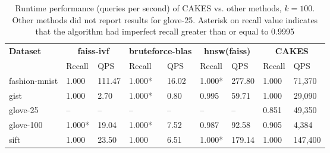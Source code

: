 \begin{table*}[!t]
    \caption{Runtime performance (queries per second) of CAKES vs. other methods, $k=100$. Other methods did not report results for glove-25. Asterisk on recall value indicates that the algorithm had imperfect recall greater than or equal to 0.9995}
    \label{table:results:ann-100}
    \vskip 0.15in
    \begin{center}
    \begin{small}
    \begin{sc}
    \begin{tabular}{|l|p{1cm}|p{1cm}|p{1cm}|p{1cm}|p{1cm}|p{1cm}|p{1cm}|p{1cm}|}
    \textbf{Dataset}  & \multicolumn{2}{|c|}{\textbf{faiss-ivf}} & \multicolumn{2}{|c|}{\textbf{bruteforce-blas}} & \multicolumn{2}{|c|}{\textbf{hnsw(faiss)}} & \multicolumn{2}{|c|}{\textbf{CAKES}} \\
    &                    Recall & QPS  & Recall & QPS     & Recall & QPS      & Recall & QPS \\
    \hline
    fashion-mnist  & 1.000 & 111.47    & 1.000* & 16.02   & 1.000* & 277.80   & 1.000 & 71,370 \\ 
    \hline
    gist           & 1.000 & 2.70      & 1.000* & 0.80    & 0.995 & 59.71     & 1.000 & 29,090 \\
    \hline
    glove-25       & -- & --           & --     & --      & -- & --           & 0.851 & 49,350 \\
    \hline
    glove-100      & 1.000* &  19.04   & 1.000* & 7.52    & 0.987 & 92.58     & 0.905 & 4,384 \\
    \hline
    sift           & 1.000 &  23.50    & 1.000  & 6.51    & 1.000* & 179.14   & 1.000 & 147,400 \\                                                 
    \hline
    \end{tabular}
    \end{sc}
    \end{small}
    \end{center}
    \vskip -0.1in
    \end{table*}


